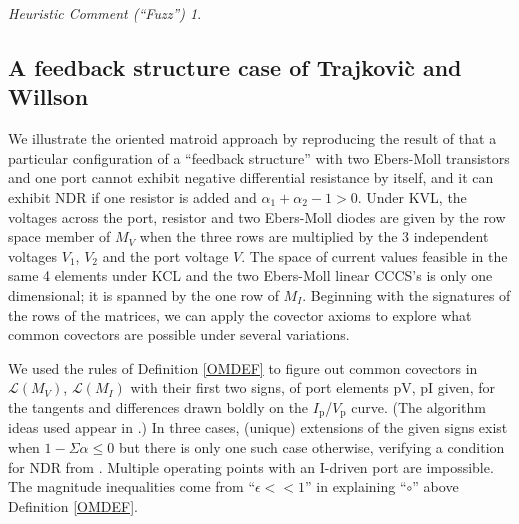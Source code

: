 \documentclass{amsproc-sunycstr}
\theoremstyle{plain}
\theoremstyle{definition}
\theoremstyle{remark}
\newtheorem{fuzz}{Heuristic Comment (``Fuzz'')}
\begin{document}
\begin{fuzz}
{}

\subsection{A feedback structure case of 
Trajkovi\`{c} and Willson \cite{TrajWillNDR}}

We illustrate the oriented matroid approach by reproducing the result of
\cite{TrajWillNDR} that a particular configuration of a ``feedback structure''
with two Ebers-Moll transistors and one port
cannot exhibit negative differential resistance by itself, and it can 
exhibit NDR if one resistor is added and $\alpha_1+\alpha_2-1>0$.  
Under KVL,
the voltages across the port, resistor
and two 
Ebers-Moll diodes are given by the row space member of $M_V$ when the
three rows are multiplied by the 3 independent voltages
$V_1$, $V_2$ and the port voltage $V$.  The space of current values
feasible in the same 4 elements under KCL and the two 
Ebers-Moll linear CCCS's
is only one dimensional; it is spanned by the one
row of $M_I$.  Beginning with the signatures of the rows of the matrices,
we can apply the covector axioms to explore what common covectors are possible
under several variations.





We used the rules of 
Definition \ref{OMDEF} to figure out common covectors in 
$\mathcal{L}(M_V)$, $\mathcal{L}(M_I)$ with 
their first two 
signs,
of port elements pV, pI given,
for the 
tangents and differences drawn boldly on the 
$I_{\mbox{p}}$/$V_{\mbox{p}}$ curve.  
(The algorithm ideas used appear in \cite{sdcOMP}.)
In three cases, (unique)
extensions of the given signs exist when $1-\Sigma\alpha\le 0$ but there is
only one such case otherwise, verifying a condition for NDR from 
\cite{TrajWillNDR}.
Multiple operating points with an I-driven port are impossible.  
The magnitude inequalities come from ``$\epsilon<<1$'' in explaining
``$\circ$'' above Definition \ref{OMDEF}.


\end{fuzz}
\end{document}
